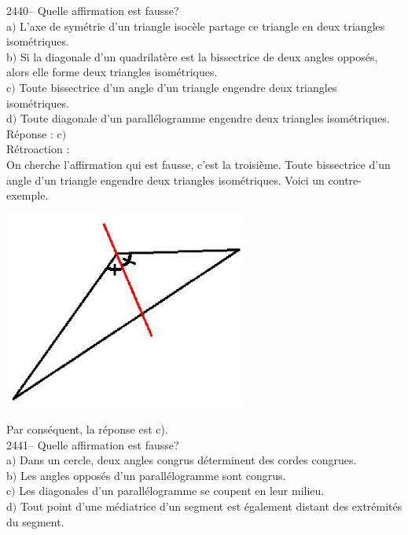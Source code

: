 \documentclass[letterpaper, 12pt]{article}
\begin{document}
2440-- Quelle affirmation est fausse?\\

a$)$ L'axe de sym\'etrie d'un triangle isoc\`ele partage ce triangle en deux triangles isom\'etriques.\\
b$)$ Si la diagonale d'un quadrilat\`ere est la bissectrice de deux angles oppos\'es, alors elle forme deux triangles isom\'etriques.\\
c$)$ Toute bissectrice d'un angle d'un triangle engendre deux triangles isom\'etriques.\\
d$)$ Toute diagonale d'un parall\'elogramme engendre deux triangles isom\'etriques.\\

R\'eponse : c$)$\\

R\'etroaction :\\
On cherche l'affirmation qui est fausse, c'est la troisi\`eme. Toute bissectrice d'un angle d'un triangle engendre deux triangles isom\'etriques. Voici un contre-exemple.
\begin{center}
 \includegraphics[width=8cm,bb=14 14 507 305]{Q2440.eps}
\end{center}
Par cons\'equent, la r\'eponse est c).\\

2441-- Quelle affirmation est fausse? \\

a$)$ Dans un cercle, deux angles congrus d\'eterminent des cordes congrues.\\
b$)$ Les angles oppos\'es d'un parall\'elogramme sont congrus.\\
c$)$ Les diagonales d'un parall\'elogramme se coupent en leur milieu.\\
d$)$ Tout point d'une m\'ediatrice d'un segment est \'egalement distant des extr\'emit\'es du segment.\\
\end{document}
